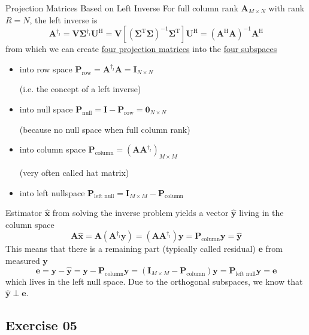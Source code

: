 \documentclass[mathserif, aspectratio=1610]{intbeamer}
\begin{document}
\begin{frame}{Projection Matrices Based on Left Inverse}
For full column rank $\bm{A}_{M \times N}$ with rank $R=N$, the left inverse is
$$\bm{A}^{\dagger_l} =
\bm{V} \bm{\Sigma}^{\dagger_l}\bm{U}^\mathrm{H} =
\bm{V} \left[(\bm{\Sigma}^\mathrm{T} \bm{\Sigma})^{-1} \bm{\Sigma}^\mathrm{T}\right] \bm{U}^\mathrm{H} =
(\bm{A}^\mathrm{H}\bm{A})^{-1} \bm{A}^\mathrm{H}$$
from which we can create \underline{four projection matrices} into the \underline{four subspaces}
\begin{itemize}
\item[-] into \textcolor{C2}{row space} $\bm{P}_\text{row} = \bm{A}^{\dagger_l} \bm{A} = \bm{I}_{N \times N}$ \begin{footnotesize}(i.e. the concept of a left inverse)\end{footnotesize}
\item[-] into \textcolor{C1}{null space} $\bm{P}_\text{null} = \bm{I} - \bm{P}_\text{row} = \bm{0}_{N \times N}$ \begin{footnotesize}(because no null space when full column rank)\end{footnotesize}
\item[-] into \textcolor{C0}{column space} $\bm{P}_\text{column} = (\bm{A} \bm{A}^{\dagger_l})_{M \times M}$ \begin{footnotesize}(very often called hat matrix)\end{footnotesize}
\item[-] into \textcolor{C4}{left nullspace} $\bm{P}_\text{left null} = \bm{I}_{M \times M} - \bm{P}_\text{column}$
\end{itemize}

Estimator $\hat{\bm{x}}$ from solving the inverse problem yields a vector $\hat{\bm{y}}$ living in the column space
$$\bm{A} \hat{\bm{x}} = \bm{A} (\bm{A}^{\dagger_l} \bm{y}) = (\bm{A} \bm{A}^{\dagger_l}) \bm{y} = \bm{P}_\text{column} \bm{y} = \hat{\bm{y}}$$
This means that there is a remaining part (typically called residual) $\bm{e}$ from measured $\bm{y}$
$$\bm{e} = \bm{y} - \hat{\bm{y}} = \bm{y} - \bm{P}_\text{column} \bm{y} = (\bm{I}_{M \times M} - \bm{P}_\text{column}) \bm{y}=
\bm{P}_\text{left null} \bm{y} = \bm{e}$$
which lives in the left null space. Due to the orthogonal subspaces, we know that $\hat{\bm{y}} \perp \bm{e}$.
\end{frame}





\subsection{Exercise 05}
\end{document}
